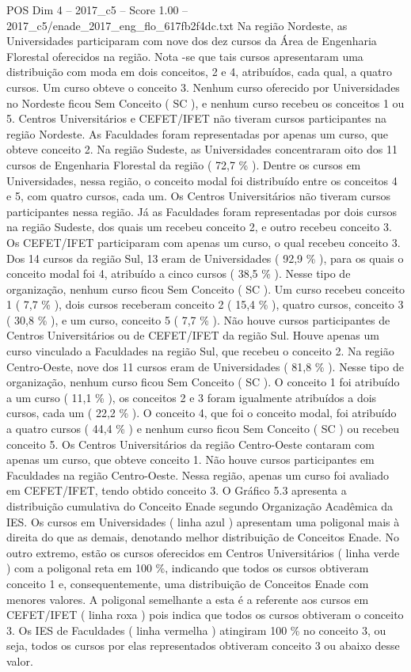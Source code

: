 \begin{textsample}{POS Dim 4 – 2017\_c5 – Score 1.00 – 2017\_c5/enade\_2017\_eng\_flo\_617fb2f4dc.txt}
Na região Nordeste, as Universidades participaram com nove dos dez cursos da Área de Engenharia Florestal oferecidos na região.
Nota -se que tais cursos apresentaram uma distribuição com moda em dois conceitos, 2 e 4, atribuídos, cada qual, a quatro cursos.
Um curso obteve o conceito 3.
Nenhum curso oferecido por Universidades no Nordeste ficou Sem Conceito ( SC ), e nenhum curso recebeu os conceitos 1 ou 5.
Centros Universitários e CEFET/IFET não tiveram cursos participantes na região Nordeste.
As Faculdades foram representadas por apenas um curso, que obteve conceito 2.
Na região Sudeste, as Universidades concentraram oito dos 11 cursos de Engenharia Florestal da região ( 72,7 \% ).
Dentre os cursos em Universidades, nessa região, o conceito modal foi distribuído entre os conceitos 4 e 5, com quatro cursos, cada um.
Os Centros Universitários não tiveram cursos participantes nessa região.
Já as Faculdades foram representadas por dois cursos na região Sudeste, dos quais um recebeu conceito 2, e outro recebeu conceito 3.
Os CEFET/IFET participaram com apenas um curso, o qual recebeu conceito 3.
Dos 14 cursos da região Sul, 13 eram de Universidades ( 92,9 \% ), para os quais o conceito modal foi 4, atribuído a cinco cursos ( 38,5 \% ).
Nesse tipo de organização, nenhum curso ficou Sem Conceito ( SC ).
Um curso recebeu conceito 1 ( 7,7 \% ), dois cursos receberam conceito 2 ( 15,4 \% ), quatro cursos, conceito 3 ( 30,8 \% ), e um curso, conceito 5 ( 7,7 \% ).
Não houve cursos participantes de Centros Universitários ou de CEFET/IFET da região Sul.
Houve apenas um curso vinculado a Faculdades na região Sul, que recebeu o conceito 2.
Na região Centro-Oeste, nove dos 11 cursos eram de Universidades ( 81,8 \% ).
Nesse tipo de organização, nenhum curso ficou Sem Conceito ( SC ).
O conceito 1 foi atribuído a um curso ( 11,1 \% ), os conceitos 2 e 3 foram igualmente atribuídos a dois cursos, cada um ( 22,2 \% ).
O conceito 4, que foi o conceito modal, foi atribuído a quatro cursos ( 44,4 \% ) e nenhum curso ficou Sem Conceito ( SC ) ou recebeu conceito 5.
Os Centros Universitários da região Centro-Oeste contaram com apenas um curso, que obteve conceito 1.
Não houve cursos participantes em Faculdades na região Centro-Oeste.
Nessa região, apenas um curso foi avaliado em CEFET/IFET, tendo obtido conceito 3.
O Gráfico 5.3 apresenta a distribuição cumulativa do Conceito Enade segundo Organização Acadêmica da IES.
Os cursos em Universidades ( linha azul ) apresentam uma poligonal mais à direita do que as demais, denotando melhor distribuição de Conceitos Enade.
No outro extremo, estão os cursos oferecidos em Centros Universitários ( linha verde ) com a poligonal reta em 100 \%, indicando que todos os cursos obtiveram conceito 1 e, consequentemente, uma distribuição de Conceitos Enade com menores valores.
A poligonal semelhante a esta é a referente aos cursos em CEFET/IFET ( linha roxa ) pois indica que todos os cursos obtiveram o conceito 3.
Os IES de Faculdades ( linha vermelha ) atingiram 100 \% no conceito 3, ou seja, todos os cursos por elas representados obtiveram conceito 3 ou abaixo desse valor.

\end{textsample}
